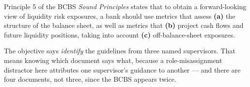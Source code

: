 \begin{lrkeybox}
Principle 5 of the BCBS \textit{Sound Principles} states that to obtain a forward-looking view of liquidity risk exposures, a bank should use metrics that assess \textbf{(a)} the structure of the balance sheet, as well as metrics that \textbf{(b)} project cash flows and future liquidity positions, taking into account \textbf{(c)} off-balance-sheet exposures.
\end{lrkeybox}


\gapbadge
{}

\begin{lrgapbox}
The objective says \emph{identify} the guidelines from three named supervisors. That means knowing which document says what, because a role-misassignment distractor here attributes one supervisor's guidance to another — and there are four documents, not three, since the BCBS appears twice.
\end{lrgapbox}

